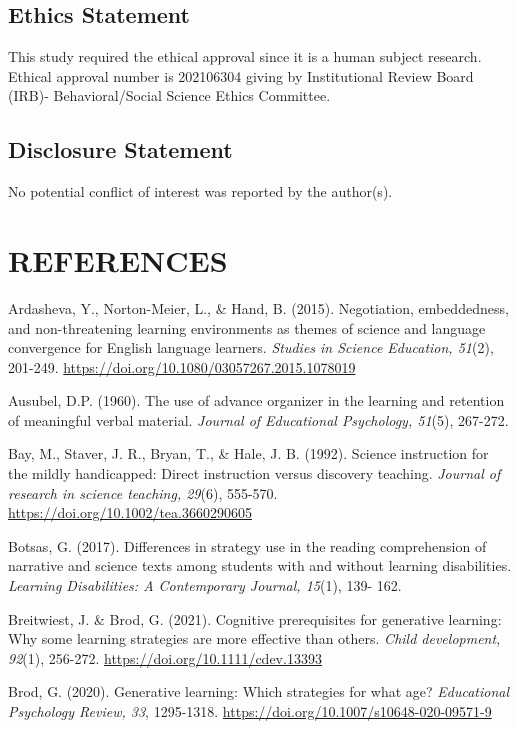 \documentclass[11.5pt]{sig-alternate} %
\begin{document}
\begin{large}
\subsection*{Ethics Statement}
This study required the ethical approval since it is a human subject research. Ethical approval number is 202106304 giving by Institutional Review Board (IRB)- Behavioral/Social Science Ethics Committee.

\subsection*{Disclosure Statement}
No potential conflict of interest was reported by the author(s).

\end{large}
\clearpage
\section*{REFERENCES}\par 

\leftskip 0.25in
\parindent -0.25in

Ardasheva, Y., Norton-Meier, L., \& Hand, B. (2015). Negotiation, embeddedness, and non-threatening learning environments as themes of science and language convergence for English language learners. \textit{Studies in Science Education, 51}(2), 201-249. \url{https://doi.org/10.1080/03057267.2015.1078019}

Ausubel, D.P. (1960). The use of advance organizer in the learning and retention of meaningful verbal material. \textit{Journal of Educational Psychology, 51}(5), 267-272. 

Bay, M., Staver, J. R., Bryan, T., \& Hale, J. B. (1992). Science instruction for the mildly handicapped: Direct instruction versus discovery teaching. \textit{Journal of research in science teaching, 29}(6), 555-570. \url{https://doi.org/10.1002/tea.3660290605}

Botsas, G. (2017). Differences in strategy use in the reading comprehension of narrative and science texts among students with and without learning disabilities. \textit{Learning Disabilities: A Contemporary Journal, 15}(1), 139- 162.

Breitwiest, J. \& Brod, G. (2021). Cognitive prerequisites for generative learning: Why some learning strategies are more effective than others. \textit{Child development, 92}(1), 256-272. \url{https://doi.org/10.1111/cdev.13393}

Brod, G. (2020). Generative learning: Which strategies for what age? \textit{Educational Psychology Review, 33}, 1295-1318. \url{https://doi.org/10.1007/s10648-020-09571-9}
\end{document}
